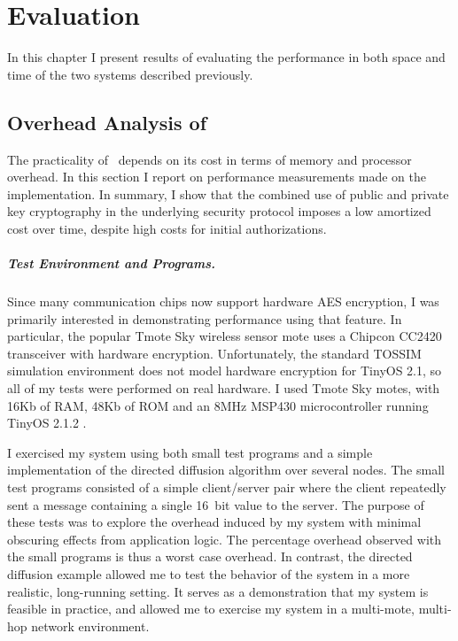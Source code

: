 
\chapter{Evaluation}
\label{chapter-evaluation}

In this chapter I present results of evaluating the performance in both space and time of
the two systems described previously.

\section{Overhead Analysis of \Sprocket}
\label{section-sprocket-overhead}

The practicality of \Sprocket\ depends on its cost in terms of memory and processor overhead. In
this section I report on performance measurements made on the implementation. In summary, I show
that the combined use of public and private key cryptography in the underlying security protocol
imposes a low amortized cost over time, despite high costs for initial authorizations.

\paragraph{Test Environment and Programs.}
Since many communication chips now support hardware AES encryption, I was primarily interested
in demonstrating performance using that feature. In particular, the popular Tmote Sky wireless
sensor mote \cite{tmotesky-datasheet} uses a Chipcon CC2420 transceiver with hardware
encryption. Unfortunately, the standard TOSSIM simulation environment does not model hardware
encryption for TinyOS 2.1, so all of my tests were performed on real hardware. I used Tmote Sky
motes, with 16Kb of RAM, 48Kb of ROM and an 8MHz MSP430 microcontroller running TinyOS 2.1.2
\cite{tinyos}.

I exercised my system using both small test programs and a simple implementation of the directed
diffusion algorithm \cite{intanagonwiwat-2003} over several nodes. The small test programs
consisted of a simple client/server pair where the client repeatedly sent a message containing a
single 16~bit value to the server. The purpose of these tests was to explore the overhead
induced by my system with minimal obscuring effects from application logic. The percentage
overhead observed with the small programs is thus a worst case overhead. In contrast, the
directed diffusion example allowed me to test the behavior of the system in a more realistic,
long-running setting. It serves as a demonstration that my system is feasible in practice, and
allowed me to exercise my system in a multi-mote, multi-hop network environment.


